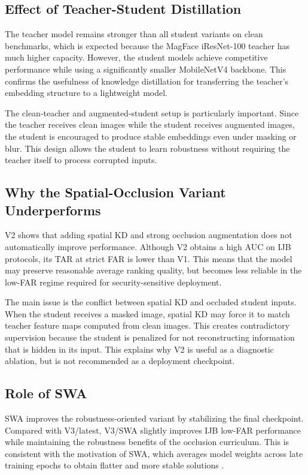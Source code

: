 \subsection{Effect of Teacher-Student Distillation}

The teacher model remains stronger than all student variants on clean benchmarks, which is expected because the MagFace iResNet-100 teacher has much higher capacity. However, the student models achieve competitive performance while using a significantly smaller MobileNetV4 backbone. This confirms the usefulness of knowledge distillation for transferring the teacher's embedding structure to a lightweight model.

The clean-teacher and augmented-student setup is particularly important. Since the teacher receives clean images while the student receives augmented images, the student is encouraged to produce stable embeddings even under masking or blur. This design allows the student to learn robustness without requiring the teacher itself to process corrupted inputs.

\subsection{Why the Spatial-Occlusion Variant Underperforms}

V2 shows that adding spatial KD and strong occlusion augmentation does not automatically improve performance. Although V2 obtains a high AUC on IJB protocols, its TAR at strict FAR is lower than V1. This means that the model may preserve reasonable average ranking quality, but becomes less reliable in the low-FAR regime required for security-sensitive deployment.

The main issue is the conflict between spatial KD and occluded student inputs. When the student receives a masked image, spatial KD may force it to match teacher feature maps computed from clean images. This creates contradictory supervision because the student is penalized for not reconstructing information that is hidden in its input. This explains why V2 is useful as a diagnostic ablation, but is not recommended as a deployment checkpoint.

\subsection{Role of SWA}

SWA improves the robustness-oriented variant by stabilizing the final checkpoint. Compared with V3/latest, V3/SWA slightly improves IJB low-FAR performance while maintaining the robustness benefits of the occlusion curriculum. This is consistent with the motivation of SWA, which averages model weights across late training epochs to obtain flatter and more stable solutions \cite{izmailov2019averagingweightsleadswider}.

